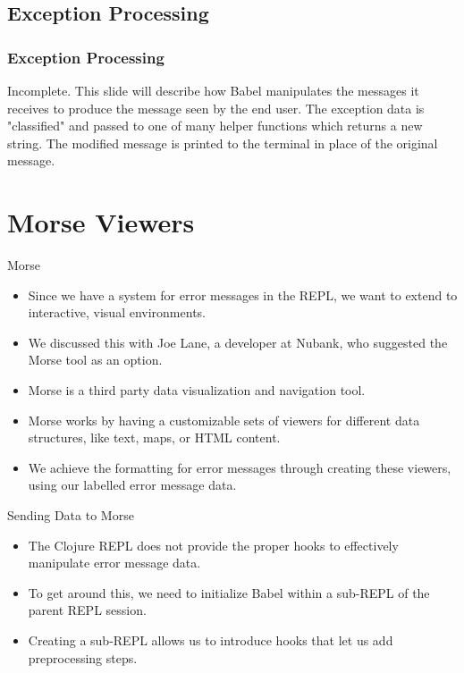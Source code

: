 \documentclass{beamer}
\begin{document}
\subsection{Exception Processing}

\begin{frame}
\frametitle{Exception Processing}
Incomplete. This slide will describe how Babel manipulates the messages it receives to produce the message seen by the end user. The exception data is "classified" and passed to one of many helper functions which returns a new string. The modified message is printed to the terminal in place of the original message.
\end{frame}

\section{Morse Viewers}

\begin{frame}{Morse}
  \begin{itemize}
    \item<1-> Since we have a system for error messages in the REPL, we want to extend to interactive, visual environments.
    \item<2-> We discussed this with Joe Lane, a developer at Nubank, who suggested the Morse tool as an option.
    \item<3-> Morse is a third party data visualization and navigation tool.
    \item<4-> Morse works by having a customizable sets of viewers for different data structures, like text, maps, or HTML content.
    \item<5-> We achieve the formatting for error messages through creating these viewers, using our labelled error message data.
  \end{itemize}
\end{frame}

\begin{frame}

\end{frame}

\begin{frame}{Sending Data to Morse}
  \begin{itemize}
    \item<1-> The Clojure REPL does not provide the proper hooks to effectively manipulate error message data.
    \item<2-> To get around this, we need to initialize Babel within a sub-REPL of the parent REPL session.
    \item<3-> Creating a sub-REPL allows us to introduce hooks that let us add preprocessing steps.
  \end{itemize}
\end{frame}
\end{document}
